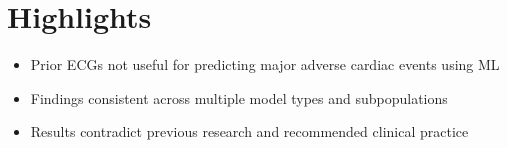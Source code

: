 \documentclass[a4paper,10pt]{article}
\begin{document}
\pagestyle{empty}
\section*{Highlights}

\begin{itemize}
  \item Prior ECGs not useful for predicting major adverse cardiac events using ML
  \item Findings consistent across multiple model types and subpopulations
  \item Results contradict previous research and recommended clinical practice
\end{itemize}
\end{document}
